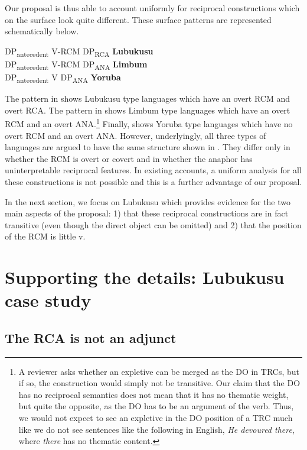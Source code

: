 \documentclass[output=paper]{langsci/langscibook}
\begin{document}
Our proposal is thus able to account uniformly for reciprocal constructions which on the surface look quite different. These surface patterns are represented schematically below.


\ea\label{ex:}
\glll DP\-\textsubscript{antecedent}      V-RCM  DP\textsubscript{RCA}    \textbf{Lubukusu}\\
DP\-\textsubscript{antecedent}      V-RCM  DP\textsubscript{ANA}    \textbf{Limbum}\\
DP\-\textsubscript{antecedent}      V    DP\textsubscript{ANA}    \textbf{Yoruba}   \\
\z

The pattern in  shows Lubukusu type languages which have an overt RCM and overt RCA. The pattern in  shows Limbum type languages which have an overt RCM and an overt ANA.\footnote{A reviewer asks whether an expletive can be merged as the DO in TRCs, but if so, the construction would simply not be transitive. Our claim that the DO has no reciprocal semantics does not mean that it has no thematic weight, but quite the opposite, as the DO has to be an argument of the verb. Thus, we would not expect to see an expletive in the DO position of a TRC much like we do not see sentences like the following in English, \textit{He devoured there}, where \textit{there} has no thematic content.}   Finally,  shows Yoruba type languages which have no overt RCM and an overt ANA. However, underlyingly, all three types of languages are argued to have the same structure shown in . They differ only in whether the RCM is overt or covert and in whether the anaphor has uninterpretable reciprocal features.  In existing accounts, a uniform analysis for all these constructions is not possible and this is a further advantage of our proposal. 

In the next section, we focus on Lubukusu which provides evidence for the two main aspects of the proposal: 1) that these reciprocal constructions are in fact transitive (even though the direct object can be omitted) and 2) that the position of the RCM is little v.

\section{Supporting the details: Lubukusu case study}
\subsection{The RCA is not an adjunct}
\end{document}
